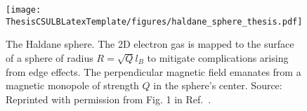     \begin{figure}[h]
    \begin{center}
    \texttt{[image: ThesisCSULBLatexTemplate/figures/haldane\_sphere\_thesis.pdf]}
    \caption[The Haldane sphere.]{The Haldane sphere. The 2D electron gas is mapped to the surface of a sphere of radius $R=\sqrt{Q}l_B$ to mitigate complications arising from edge effects. The perpendicular magnetic field emanates from a magnetic monopole of strength $Q$ in the sphere's center. Source: Reprinted with permission from Fig. 1 in  Ref.~\cite{arciniaga}.}
    \label{fig:haldSpher}
    \end{center}
    \end{figure}
    
    \vspace{4pt} %
    
